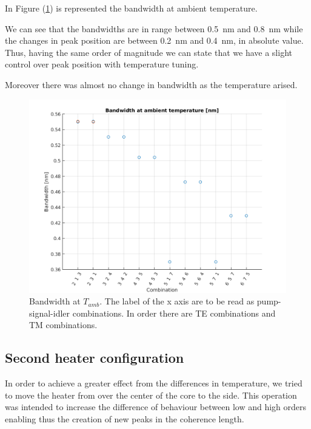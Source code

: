 \documentclass[12pt,a4paper,twoside]{article}
\begin{document}
In Figure (\ref{fig_sym_b@t2}) is represented the bandwidth at ambient temperature.

We can see that the bandwidths are in range between \SI{.5}{\nm} and \SI{.8}{\nm} while the changes in peak position are between \SI{.2}{\nm} and \SI{.4}{\nm}, in absolute value.
Thus, having the same order of magnitude we can state that we have a slight control over peak position with temperature tuning.

Moreover there was almost no change in bandwidth as the temperature arised.
\begin{figure}[!h]
	\centering
	\includegraphics[width=.85\textwidth]{baat2.png}
	\caption{Bandwidth at $T_{amb}$. The label of the x axis are to be read as pump-signal-idler combinations. In order there are TE combinations and TM combinations.}
	\label{fig_sym_b@t2} %
\end{figure}		
		

\clearpage
\subsection{Second heater configuration}
In order to achieve a greater effect from the differences in temperature, we tried to move the heater from over the center of the core to the side.
This operation was intended to increase the difference of behaviour between low and high orders enabling thus the creation of new peaks in the coherence length.
\end{document}
